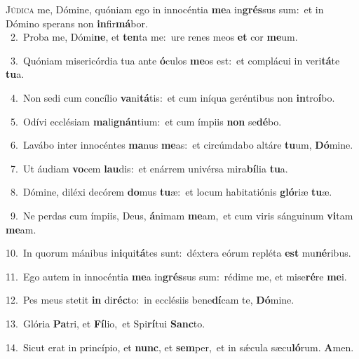 \lettrine{\initial\textcolor{\initialcolor}{J}}{údica} me, Dómine, quóniam ego in innocéntia \textbf{me}\-a in\-\textbf{grés}\-sus sum:~\star et in Dómino sperans non \textbf{in}\-fir\-\textbf{má}\-bor.\\
{\numbfont\textcolor{\numbcolor}{~2.}}~Proba me, Dómi\-\textbf{ne}\-, et \textbf{ten}\-ta me:~\star ure renes meos \textbf{et} cor \textbf{me}\-um.\par
{\numbfont\textcolor{\numbcolor}{~3.}}~Quóniam misericórdia tua ante \textbf{ó}\-culos \textbf{me}\-os est:~\star et complácui in veri\-\textbf{tá}\-te \textbf{tu}\-a.\par
{\numbfont\textcolor{\numbcolor}{~4.}}~Non sedi cum concílio \textbf{va}\-ni\-\textbf{tá}\-tis:~\star et cum iníqua geréntibus non \textbf{in}\-tro\-\textbf{í}\-bo.\par
{\numbfont\textcolor{\numbcolor}{~5.}}~Odívi ecclésiam \textbf{ma}\-li\-\textbf{gnán}\-tium:~\star et cum ímpiis \textbf{non} se\-\textbf{dé}\-bo.\par
{\numbfont\textcolor{\numbcolor}{~6.}}~Lavábo inter innocéntes \textbf{ma}\-nus \textbf{me}\-as:~\star et circúmdabo altáre \textbf{tu}\-um, \textbf{Dó}\-mine.\par
{\numbfont\textcolor{\numbcolor}{~7.}}~Ut áudiam \textbf{vo}\-cem \textbf{lau}\-dis:~\star et enárrem univérsa mira\-\textbf{bí}\-lia \textbf{tu}\-a.\par
{\numbfont\textcolor{\numbcolor}{~8.}}~Dómine, diléxi decórem \textbf{do}\-mus \textbf{tu}\-æ:~\star et locum habitatiónis \textbf{gló}\-riæ \textbf{tu}\-æ.\par
{\numbfont\textcolor{\numbcolor}{~9.}}~Ne perdas cum ímpiis, Deus, \textbf{á}\-nimam \textbf{me}\-am,~\star et cum viris sánguinum \textbf{vi}\-tam \textbf{me}\-am.\par
{\numbfont\textcolor{\numbcolor}{10.}}~In quorum mánibus in\-\textbf{i}\-qui\-\textbf{tá}\-tes sunt:~\star déxtera eórum repléta \textbf{est} mu\-\textbf{né}\-ribus.\par
{\numbfont\textcolor{\numbcolor}{11.}}~Ego autem in innocéntia \textbf{me}\-a in\-\textbf{grés}\-sus sum:~\star rédime me, et mise\-\textbf{ré}\-re \textbf{me}\-i.\par
{\numbfont\textcolor{\numbcolor}{12.}}~Pes meus stetit \textbf{in} di\-\textbf{réc}\-to:~\star in ecclésiis bene\-\textbf{dí}\-cam te, \textbf{Dó}\-mine.\par
{\numbfont\textcolor{\numbcolor}{13.}}~Glória \textbf{Pa}\-tri, et \textbf{Fí}\-lio,~\star et Spi\-\textbf{rí}\-tui \textbf{Sanc}\-to.\par
{\numbfont\textcolor{\numbcolor}{14.}}~Sicut erat in princípio, et \textbf{nunc}\-, et \textbf{sem}\-per,~\star et in sǽcula sæcu\-\textbf{ló}\-rum. \textbf{A}\-men.\par
